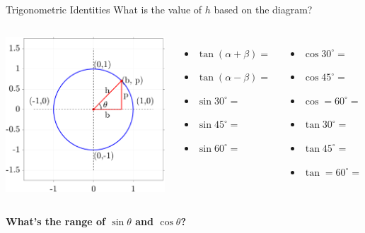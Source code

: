\documentclass[aspectratio=169,xcolor=dvipsnames,svgnames,x11names,fleqn]{beamer}
\begin{document}
\begin{frame}{Trigonometric Identities}
What is the value of $h$ based on the diagram?
    \begin{columns}
 \includegraphics[width=0.99\linewidth, trim=2cm 2cm 1cm 1cm,clip]{figures/unit_circle_right_triangle.png}
        \begin{itemize}
            \item $\tan(\alpha + \beta) = $

             \item $\tan(\alpha - \beta) = $

              \item $\sin 30^{\circ} = $
            \item $\sin 45^{\circ} = $
            \item $\sin 60^{\circ} = $

             \end{itemize}
 \begin{itemize}
              \item $\cos 30^{\circ} = $
            \item $\cos 45^{\circ} = $
            \item $\cos=60^{\circ} = $

               \item $\tan 30^{\circ} = $
            \item $\tan 45^{\circ} = $
            \item $\tan=60^{\circ} = $
            
        \end{itemize}
    \end{columns}

\bf \centering
    What's the range of $\sin \theta$ and $\cos \theta$?
\end{frame}
\end{document}
